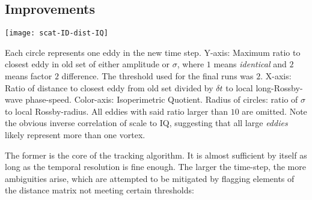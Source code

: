 \subsection{Improvements}
 \begin{marginfigure}
	\texttt{[image: scat-ID-dist-IQ]}
	\caption{Each circle represents one eddy in the new time step. Y-axis: Maximum ratio to closest eddy in old set of either amplitude or $\sigma$, where $1$ means \textit{identical} and $2$ means factor $2$ difference. The threshold used for the final runs was $2$. X-axis: Ratio of distance to closest eddy from old set divided by $\delta t$ to local long-Rossby-wave phase-speed. Color-axis: Isoperimetric Quotient. Radius of circles: ratio of $\sigma$ to local Rossby-radius. All eddies with said ratio larger than $10$ are omitted. Note the obvious inverse correlation of scale to IQ, suggesting that all large \textit{eddies} likely represent more than one vortex. }
	\label{fig:scat-ID-dist-IQ}
\end{marginfigure}
The former is the core of the tracking algorithm. It is almost sufficient by itself as long as the temporal resolution is fine enough. The larger the time-step, the more ambiguities arise, which are attempted to be mitigated by flagging elements of the distance matrix not meeting certain thresholds:
